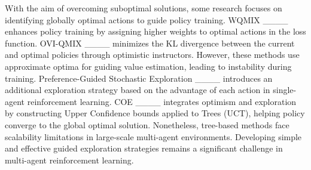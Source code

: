 With the aim of overcoming suboptimal solutions, some research focuses on identifying globally optimal actions to guide policy training. WQMIX ____ enhances policy training by assigning higher weights to optimal actions in the loss function. OVI-QMIX ____ minimizes the KL divergence between the current and optimal policies through optimistic instructors. However, these methods use approximate optima for guiding value estimation, leading to instability
during training. Preference-Guided Stochastic Exploration ____ introduces an additional exploration strategy based on the advantage of each action in single-agent reinforcement learning. COE ____ integrates optimism and exploration by constructing Upper Confidence bounds applied to Trees (UCT), helping policy converge to the global optimal solution. Nonetheless, tree-based methods face scalability limitations in large-scale multi-agent environments. Developing simple and effective guided exploration strategies remains a significant challenge in multi-agent reinforcement learning.
